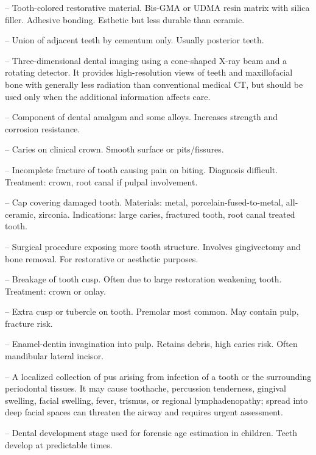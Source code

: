 -- Tooth-colored restorative material. Bis-GMA or UDMA resin matrix with silica filler. Adhesive bonding. Esthetic but less durable than ceramic.

-- Union of adjacent teeth by cementum only. Usually posterior teeth.

-- Three-dimensional dental imaging using a cone-shaped X-ray beam and a rotating detector. It provides high-resolution views of teeth and maxillofacial bone with generally less radiation than conventional medical CT, but should be used only when the additional information affects care.

-- Component of dental amalgam and some alloys. Increases strength and corrosion resistance.

-- Caries on clinical crown. Smooth surface or pits/fissures.

-- Incomplete fracture of tooth causing pain on biting. Diagnosis difficult. Treatment: crown, root canal if pulpal involvement.

-- Cap covering damaged tooth. Materials: metal, porcelain-fused-to-metal, all-ceramic, zirconia. Indications: large caries, fractured tooth, root canal treated tooth.

-- Surgical procedure exposing more tooth structure. Involves gingivectomy and bone removal. For restorative or aesthetic purposes.

-- Breakage of tooth cusp. Often due to large restoration weakening tooth. Treatment: crown or onlay.

-- Extra cusp or tubercle on tooth. Premolar most common. May contain pulp, fracture risk.

-- Enamel-dentin invagination into pulp. Retains debris, high caries risk. Often mandibular lateral incisor.

-- A localized collection of pus arising from infection of a tooth or the surrounding periodontal tissues. It may cause toothache, percussion tenderness, gingival swelling, facial swelling, fever, trismus, or regional lymphadenopathy; spread into deep facial spaces can threaten the airway and requires urgent assessment.

-- Dental development stage used for forensic age estimation in children. Teeth develop at predictable times.

